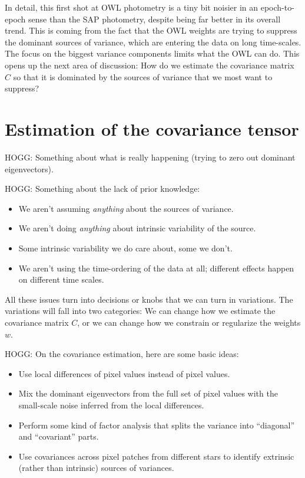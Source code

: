 \documentclass[12pt, letterpaper, preprint]{aastex}
\begin{document}
In detail, this first shot at OWL photometry is a tiny bit noisier
  in an epoch-to-epoch sense
  than the SAP photometry,
  despite being far better in its overall trend.
This is coming from the fact that the OWL weights are trying to suppress the dominant
  sources of variance,
  which are entering the data on long time-scales.
The focus on the biggest variance components limits what the OWL can do.
This opens up the next area of discussion:
How do we estimate the covariance matrix $\hat{C}$ so that it is dominated by the sources of variance
  that we most want to suppress?

\section{Estimation of the covariance tensor}

HOGG:
Something about what is really happening (trying to zero out dominant eigenvectors).

HOGG:
Something about the lack of prior knowledge:
\begin{itemize}
\item
We aren't assuming \emph{anything} about the sources of variance.
\item
We aren't doing \emph{anything} about intrinsic variability of the source.
\item
Some intrinsic variability we do care about, some we don't.
\item
We aren't using the time-ordering of the data at all;
  different effects happen on different time scales.
\end{itemize}
All these issues turn into decisions or knobs that we can turn in variations.
The variations will fall into two categories:
We can change how we estimate the covariance matrix $C$,
  or we can change how we constrain or regularize the weights $w$.

HOGG:
On the covariance estimation, here are some basic ideas:
\begin{itemize}
\item
Use local differences of pixel values instead of pixel values.
\item
Mix the dominant eigenvectors from the full set of pixel values
  with the small-scale noise inferred from the local differences.
\item
Perform some kind of factor analysis that splits the variance into
  ``diagonal'' and ``covariant'' parts.
\item
Use covariances across pixel patches from different stars
  to identify extrinsic (rather than intrinsic)
  sources of variances.
\end{itemize}
\end{document}
